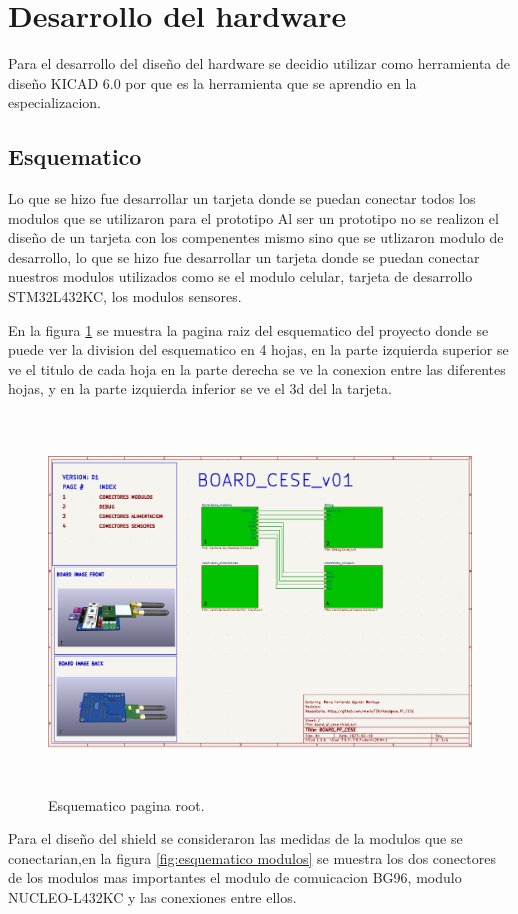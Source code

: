 \section{Desarrollo del hardware}

Para el desarrollo del diseño del hardware se decidio utilizar como herramienta de diseño KICAD 6.0 por que es la herramienta que se aprendio en la especializacion.

\subsection{Esquematico} 
Lo que se hizo fue desarrollar un tarjeta donde se puedan conectar todos los modulos que se utilizaron para el prototipo
Al ser un prototipo no se realizon el diseño de un tarjeta con los compenentes mismo sino que se utlizaron modulo de desarrollo, lo que se hizo fue desarrollar un tarjeta donde se puedan conectar nuestros modulos utilizados como se el modulo celular, tarjeta de desarrollo STM32L432KC, los modulos sensores.

En la figura \ref{fig:esquematico root} se muestra la pagina raiz del esquematico del proyecto donde se puede ver la division del esquematico en 4 hojas, en la parte izquierda superior se ve el titulo de cada hoja en la parte derecha se ve la conexion entre las diferentes hojas, y en la parte izquierda inferior se ve el 3d del la tarjeta. 

\begin{figure}[h]
  \centering
	\includegraphics[width=\textwidth, height=10cm]{./Figures/esquematico_root.png}
	\caption{Esquematico pagina root.}
	\label{fig:esquematico root}
\end{figure}
\clearpage
Para el diseño del shield se consideraron las medidas de la modulos que se conectarian,en la figura \ref{fig:esquematico modulos} se muestra los dos conectores de los modulos mas importantes el modulo de comuicacion BG96, modulo NUCLEO-L432KC y las conexiones entre ellos.

